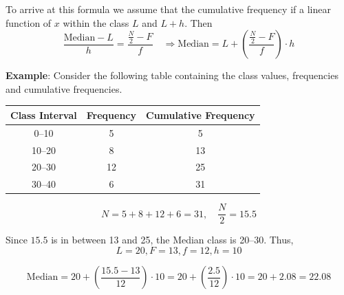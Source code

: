 \documentclass[twoside]{book}
\begin{document}
\begin{enumerate}
To arrive at this formula we assume that the cumulative frequency if a linear function of $x$ within the class $L$ and $L+h$. Then
$$\dfrac{\text{Median} - L}{h} = \dfrac{\frac{N}{2}-F}{f} \quad \Rightarrow \text{Median} = L + \left( \frac{\frac{N}{2} - F}{f} \right) \cdot h$$

\begin{center}
\end{center}

\textbf{Example}: Consider the following table containing the class values, frequencies and cumulative frequencies.
\begin{center}
\begin{tabular}{c|c|c}
\hline
Class Interval & Frequency & Cumulative Frequency \\
\hline
0--10 & 5 & 5\\
10--20 & 8 & 13\\
20--30 & 12 & 25\\
30--40 & 6 & 31\\
\hline
\end{tabular}
\end{center}


\[
N = 5 + 8 + 12 + 6 = 31,\quad \frac{N}{2} = 15.5
\]

Since $15.5$ is in between 13 and 25, the Median class is 20--30. Thus,
$$L = 20, F = 13, f = 12, h = 10$$

\[
\text{Median} = 20 + \left( \frac{15.5 - 13}{12} \right) \cdot 10 = 20 + \left( \frac{2.5}{12} \right) \cdot 10 = 20 + 2.08 = 22.08
\]
\end{enumerate}
\end{document}
